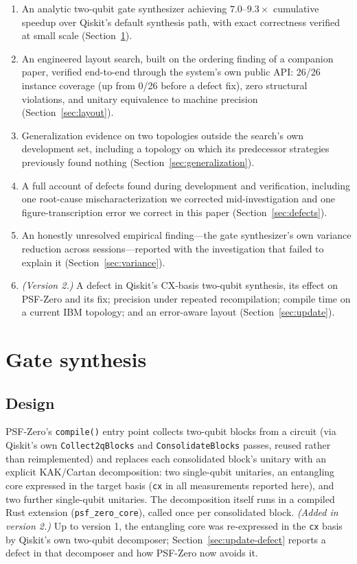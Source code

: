 \documentclass[11pt]{article}
\begin{document}
\begin{enumerate}
\item An analytic two-qubit gate synthesizer achieving
$7.0$--$9.3\times$ cumulative speedup over Qiskit's default synthesis
path, with exact correctness verified at small scale
(Section~\ref{sec:synth}).
\item An engineered layout search, built on the ordering finding of a
companion paper, verified end-to-end through the system's own public
API: 26/26 instance coverage (up from 0/26 before a defect fix),
zero structural violations, and unitary equivalence to machine
precision (Section~\ref{sec:layout}).
\item Generalization evidence on two topologies outside the search's
own development set, including a topology on which its predecessor
strategies previously found nothing (Section~\ref{sec:generalization}).
\item A full account of defects found during development and
verification, including one root-cause mischaracterization we
corrected mid-investigation and one figure-transcription error we
correct in this paper (Section~\ref{sec:defects}).
\item An honestly unresolved empirical finding---the gate synthesizer's
own variance reduction across sessions---reported with the
investigation that failed to explain it (Section~\ref{sec:variance}).
\item \emph{(Version 2.)} A defect in Qiskit's CX-basis two-qubit
synthesis, its effect on PSF-Zero and its fix; precision under repeated
recompilation; compile time on a current IBM topology; and an
error-aware layout (Section~\ref{sec:update}).
\end{enumerate}

\section{Gate synthesis}
\label{sec:synth}

\subsection{Design}

PSF-Zero's \texttt{compile()} entry point collects two-qubit blocks from
a circuit (via Qiskit's own \texttt{Collect2qBlocks} and
\texttt{ConsolidateBlocks} passes, reused rather than reimplemented) and
replaces each consolidated block's unitary with an explicit KAK/Cartan
decomposition: two single-qubit unitaries, an entangling core expressed
in the target basis (\texttt{cx} in all measurements reported here), and
two further single-qubit unitaries. The decomposition itself runs in a
compiled Rust extension (\texttt{psf\_zero\_core}), called once per
consolidated block. \emph{(Added in version 2.)} Up to version 1, the
entangling core was re-expressed in the \texttt{cx} basis by Qiskit's own
two-qubit decomposer; Section~\ref{sec:update-defect} reports a defect in
that decomposer and how PSF-Zero now avoids it.
\end{document}
